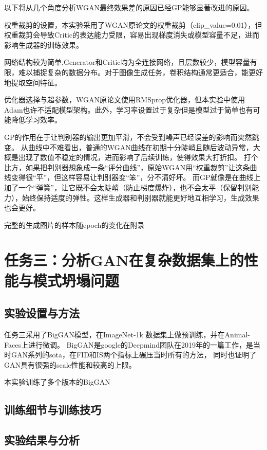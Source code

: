 \documentclass[12pt, a4paper]{article}
\begin{document}
以下将从几个角度分析WGAN最终效果差的原因已经GP能够显著改进的原因。

权重裁剪的设置，本实验采用了WGAN原论文的权重裁剪（clip\_value=0.01），但权重裁剪会导致Critic的表达能力受限，容易出现梯度消失或模型容量不足，进而影响生成器的训练效果。

网络结构较为简单,Generator和Critic均为全连接网络，且层数较少，模型容量有限，难以捕捉复杂的数据分布。对于图像生成任务，卷积结构通常更适合，能更好地提取空间特征。

优化器选择与超参数，WGAN原论文使用RMSprop优化器，但本实验中使用Adam也许不适配模型架构。此外，学习率设置过于复杂但是模型过于简单也有可能降低学习效率。

GP的作用在于让判别器的输出更加平滑，不会受到噪声已经误差的影响而突然跳变。
从曲线中不难看出，普通的WGAN曲线在初期十分陡峭且随后波动异常，大概是出现了数值不稳定的情况，进而影响了后续训练，使得效果大打折扣。
打个比方，如果把判别器想象成一条“评分曲线”，原始WGAN用“权重裁剪”让这条曲线变得很“平”，但这样容易让判别器变“笨”，分不清好坏。
而GP就像是在曲线上加了一个“弹簧”，让它既不会太陡峭（防止梯度爆炸），也不会太平（保留判别能力），始终保持适度的弹性。这样生成器和判别器就能更好地互相学习，生成效果也会更好。


\vspace{1cm}
完整的生成图片的样本随epoch的变化在附录


\newpage
\section{任务三：分析GAN在复杂数据集上的性能与模式坍塌问题}
\subsection{实验设置与方法}
任务三采用了BigGAN模型，在ImageNet-1k 数据集上做预训练，并在Animal-Faces上进行微调。
BigGAN是google的Deepmind团队在2019年的一篇工作，是当时GAN系列的sota，在FID和IS两个指标上碾压当时所有的方法，
同时也证明了GAN具有很强的scale性能和较高的上限。

本实验训练了多个版本的BigGAN

\subsection{训练细节与训练技巧}

\subsection{实验结果与分析}
\end{document}
